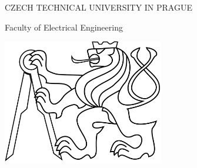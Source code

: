 \pagestyle{plain}

\begin{titlepage}
\begin{center}

{\Large CZECH TECHNICAL UNIVERSITY IN PRAGUE}
\vskip 10pt

\vskip 8pt
{\Large Faculty of Electrical Engineering}
\vspace{50pt}

\includegraphics[width=7cm]{fig/lev.pdf} \\
\vspace{160pt}
{\Large\bf \Title} \\
\vspace{10pt}
{\Large\rm \Author } \\




\vspace{30pt}
\end{center}
\end{titlepage}

\pagestyle{empty}
